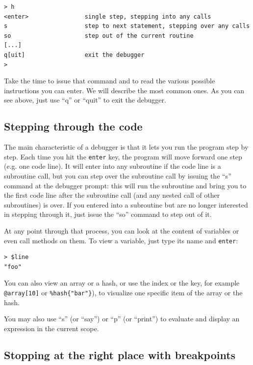 \begin{verbatim}
> h
<enter>                single step, stepping into any calls
s                      step to next statement, stepping over any calls
so                     step out of the current routine
[...]
q[uit]                 exit the debugger
>
\end{verbatim}

Take the time to issue that command and to read the 
various possible instructions you can enter. We will 
describe the most common ones. As you can see 
above, just use ``q'' or ``quit'' to exit the debugger.

\subsection{Stepping through the code}


The main characteristic of a debugger is that it lets you run the program step 
by step. Each time you hit the {\tt enter} key, the 
program will move forward one step (e.g. one code line). 
It will enter into any subroutine if the code line 
is a subroutine call, but you can step over the 
subroutine call by issuing the ``s'' 
command at the debugger prompt: this will run the subroutine 
and bring you to the first code line after the subroutine 
call (and any nested call of other subroutines) is over.
If you entered into a subroutine but are no longer 
interested in stepping through it, just issue the ``so'' 
command to step out of it.

At any point through that process, you can look at the 
content of variables or even call methods on them. To 
view a variable, just type its name and {\tt enter}:

\begin{verbatim}
> $line
"foo"
\end{verbatim}

You can also view an array or a hash, or use the index 
or the key, for example \verb'@array[10]' or 
\verb'%hash{"bar"}'), to visualize one specific item of 
the array or the hash.

You may also use ``s'' (or ``say'') or ``p'' (or ``print'') 
to evaluate and display an expression in the current scope.

\subsection{Stopping at the right place with breakpoints}

